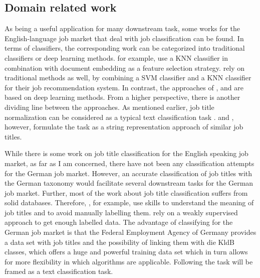 \documentclass[12pt, a4paper, titlepage]{article}
\begin{document}
\subsection*{Domain related work}
As being a useful application for many downstream task, some works for the English-language job market that deal with job classification can be found. In terms of classifiers, the corresponding work can be categorized into traditional classifiers or deep learning methods. \cite{zhu2017} for example, use a \ac{KNN} classifier in combination with document embedding as a feature selection strategy. \cite{javed2015} rely on traditional methods as well, by combining a \ac{SVM} classifier and a \ac{KNN} classifier for their job recommendation system. In contrast, the approaches of \cite{decorte2021}, \cite{wang2019} and \cite{neculoiu2016} are based on deep learning methods. From a higher perspective, there is another dividing line between the approaches. As mentioned earlier, job title normalization can be considered as a typical text classification task \citep{wang2019, javed2015, zhu2017}. \cite{decorte2021} and \cite{neculoiu2016}, however, formulate the task as a string representation approach of similar job titles. 

While there is some work on job title classification for the English speaking job market, as far as I am concerned, there have not been any classification attempts for the German job market. However, an accurate classification of job titles with the German taxonomy would facilitate several downstream tasks for the German job market. Further, most of the work about job title classification suffers from solid databases. Therefore, \cite{decorte2021}, for example, use skills to understand the meaning of job titles and to avoid manually labelling them. \cite{javed2015} rely on a weakly supervised approach to get enough labelled data. The advantage of classifying for the German job market is that the Federal Employment Agency of Germany provides a data set with job titles and the possibility of linking them with die KldB classes, which offers a huge and powerful training data set which in turn allows for more flexibility in which algorithms are applicable. Following \citet{wang2019, javed2015, zhu2017} the task will be framed as a text classification task. 
\end{document}
